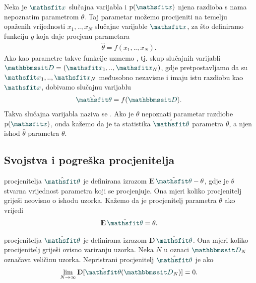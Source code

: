 \documentclass[utf8, diplomski, lmodern]{fer}
\begin{document}
Neka je $\rvar x$ slučajna varijabla i $\p(\rvar x)$ njena razdioba s nama nepoznatim parametrom $\theta$. Taj parametar možemo procijeniti na temelju opaženih vrijednosti $x_1,..,x_N$ slučajne varijable $\rvar x$, za što definiramo funkciju $g$ koja daje procjenu parametara
\begin{align}
\hat{\theta}=f(x_1,..,x_N) \text{.}
\end{align}
Ako kao parametre takve funkcije uzmemo , tj. skup slučajnih varijabli $\rset D=\del{\rvar x_1,..,\rvar x_N}$, gdje pretpostavljamo da su $\rvar x_1,..,\rvar x_N$ međusobno nezavisne i imaju istu razdiobu kao $\rvar x$, dobivamo slučajnu varijablu
\begin{align}
\hat{\rvar\theta}=f(\rset D) \text{.}
\end{align}
Takva slučajna varijabla naziva se . Ako je $\theta$ nepoznati parametar razdiobe $\p(\rvar x)$, onda kažemo da je ta statistika $\hat{\rvar\theta}$  parametra $\theta$, a njen ishod $\hat{\theta}$  parametra $\theta$.

\subsection{Svojstva i pogreška procjenitelja}

 procjenitelja $\hat{\rvar\theta}$ je definirana izrazom $\E\hat{\rvar\theta} - \theta$, gdje je $\theta$ stvarna vrijednost parametra koji se procjenjuje. Ona mjeri koliko procjenitelj griješi neovisno o ishodu uzorka. Kažemo da je procjenitelj parametra $\theta$  ako vrijedi
\begin{align}
\E\hat{\rvar\theta} = \theta \text{.}
\end{align}

 procjenitelja $\hat{\rvar\theta}$ je definirana izrazom $\D\hat{\rvar\theta}$. Ona mjeri koliko procijenitelj griješi ovisno variranju uzorka. 
Neka $N$ u oznaci ${\rset D}_N$ označava veličinu uzorka. Nepristrani procjenitelj $\hat{\rvar\theta}$ je  ako 
\begin{align}
\lim_{N\to\infty} \D\sbr{\hat{\rvar\theta}(\rset D_N)} = 0  \text{.}
\end{align}
\end{document}
